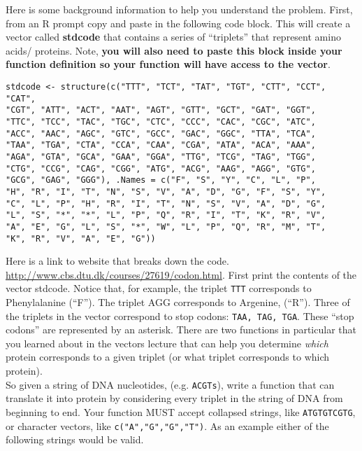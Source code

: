 \documentclass{article}
\begin{document}
Here is some background information to help you understand the problem. First, from an R prompt copy and paste in the following code block. This will create a vector called \textbf{stdcode} that contains a series of ``triplets'' that represent amino acids/ proteins. Note, \textbf{you will also need to paste this block inside your function definition so your function will have access to the vector}. 
\newline
\\
\begin{verbatim}
stdcode <- structure(c("TTT", "TCT", "TAT", "TGT", "CTT", "CCT", "CAT", 
"CGT", "ATT", "ACT", "AAT", "AGT", "GTT", "GCT", "GAT", "GGT", 
"TTC", "TCC", "TAC", "TGC", "CTC", "CCC", "CAC", "CGC", "ATC", 
"ACC", "AAC", "AGC", "GTC", "GCC", "GAC", "GGC", "TTA", "TCA", 
"TAA", "TGA", "CTA", "CCA", "CAA", "CGA", "ATA", "ACA", "AAA", 
"AGA", "GTA", "GCA", "GAA", "GGA", "TTG", "TCG", "TAG", "TGG", 
"CTG", "CCG", "CAG", "CGG", "ATG", "ACG", "AAG", "AGG", "GTG", 
"GCG", "GAG", "GGG"), .Names = c("F", "S", "Y", "C", "L", "P", 
"H", "R", "I", "T", "N", "S", "V", "A", "D", "G", "F", "S", "Y", 
"C", "L", "P", "H", "R", "I", "T", "N", "S", "V", "A", "D", "G", 
"L", "S", "*", "*", "L", "P", "Q", "R", "I", "T", "K", "R", "V", 
"A", "E", "G", "L", "S", "*", "W", "L", "P", "Q", "R", "M", "T", 
"K", "R", "V", "A", "E", "G"))
\end{verbatim}

Here is a link to website that breaks down the code. \url{http://www.cbs.dtu.dk/courses/27619/codon.html}. First print the contents of the vector stdcode. Notice that, for example, the triplet \texttt{TTT} corresponds to Phenylalanine (``F''). The triplet AGG corresponds to Argenine, (``R''). Three of the triplets in the vector correspond to stop codons: \texttt{TAA, TAG, TGA}. These ``stop codons'' are represented by an asterisk. There are two functions in particular that you learned about in the vectors lecture that can help you determine \emph{which} protein corresponds to a given triplet (or what triplet corresponds to which protein). 
\newline
\\
So given a string of DNA nucleotides, (e.g. \texttt{ACGTs}), write a function that can translate it into protein by considering every triplet in the string of DNA from beginning to end. Your function MUST accept collapsed strings, like \texttt{ATGTGTCGTG}, or character vectors, like \texttt{c("A","G","G","T")}. As an example either of the following strings would be valid.
\end{document}
